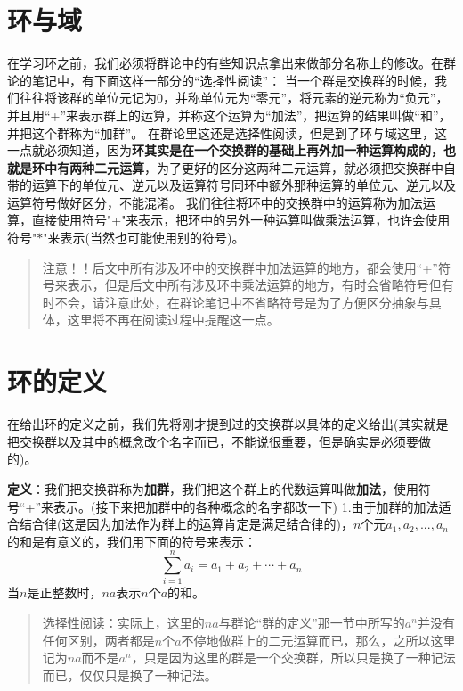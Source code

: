 \documentclass[12pt, a4paper, oneside]{ctexart}
\newenvironment{myquote}{\begin{quote}\small\color{gray}}{\end{quote}}
\begin{document}
\section{环与域}


在学习环之前，我们必须将群论中的有些知识点拿出来做部分名称上的修改。在群论的笔记中，有下面这样一部分的“选择性阅读”：
当一个群是交换群的时候，我们往往将该群的单位元记为0，并称单位元为“零元”，将元素的逆元称为“负元”，并且用“+”来表示群上的运算，并称这个运算为“加法”，把运算的结果叫做“和”，并把这个群称为“加群”。
在群论里这还是选择性阅读，但是到了环与域这里，这一点就必须知道，因为\textbf{环其实是在一个交换群的基础上再外加一种运算构成的，也就是环中有两种二元运算}，为了更好的区分这两种二元运算，就必须把交换群中自带的运算下的单位元、逆元以及运算符号同环中额外那种运算的单位元、逆元以及运算符号做好区分，不能混淆。
我们往往将环中的交换群中的运算称为加法运算，直接使用符号"+"来表示，把环中的另外一种运算叫做乘法运算，也许会使用符号"$*$"来表示(当然也可能使用别的符号)。

\begin{myquote}
注意！！后文中所有涉及环中的交换群中加法运算的地方，都会使用“+”符号来表示，但是后文中所有涉及环中乘法运算的地方，有时会省略符号但有时不会，请注意此处，在群论笔记中不省略符号是为了方便区分抽象与具体，这里将不再在阅读过程中提醒这一点。
\end{myquote}

\section{环的定义}

在给出环的定义之前，我们先将刚才提到过的交换群以具体的定义给出(其实就是把交换群以及其中的概念改个名字而已，不能说很重要，但是确实是必须要做的)。

\textbf{定义}：我们把交换群称为\textbf{加群}，我们把这个群上的代数运算叫做\textbf{加法}，使用符号“+”来表示。(接下来把加群中的各种概念的名字都改一下)
1.由于加群的加法适合结合律(这是因为加法作为群上的运算肯定是满足结合律的)，$n$个元$a_1,a_2,...,a_n$的和是有意义的，我们用下面的符号来表示：
\[
\sum_{i=1}^na_i=a_1+a_2+\cdots+a_n
\]
当$n$是正整数时，$na$表示$n$个$a$的和。

\begin{myquote}
选择性阅读：实际上，这里的$na$与群论“群的定义”那一节中所写的$a^n$并没有任何区别，两者都是$n$个$a$不停地做群上的二元运算而已，那么，之所以这里记为$na$而不是$a^n$，只是因为这里的群是一个交换群，所以只是换了一种记法而已，仅仅只是换了一种记法。
\end{myquote}
\end{document}
